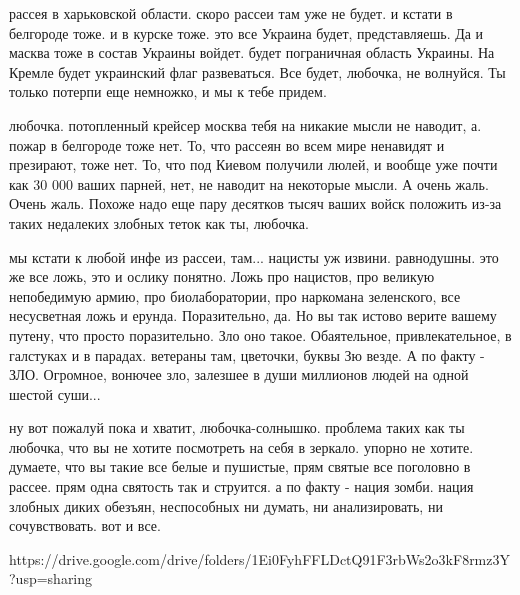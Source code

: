 рассея в харьковской области. скоро рассеи там уже не будет. и кстати в
белгороде тоже. и в курске тоже. это все Украина будет, представляешь. Да и
масква тоже в состав Украины войдет. будет пограничная область Украины. На
Кремле будет украинский флаг развеваться. Все будет, любочка, не волнуйся. Ты
только потерпи еще немножко, и мы к тебе придем.

любочка. потопленный крейсер москва тебя на никакие мысли не наводит, а. пожар
в белгороде тоже нет. То, что рассеян во всем мире ненавидят и презирают, тоже
нет. То, что под Киевом получили люлей, и вообще уже почти как 30 000 ваших
парней, нет, не наводит на некоторые мысли. А очень жаль. Очень жаль. Похоже
надо еще пару десятков тысяч ваших войск положить из-за таких недалеких злобных
теток как ты, любочка.

мы кстати к любой инфе из рассеи, там... нацисты уж извини. равнодушны. это же
все ложь, это и ослику понятно. Ложь про нацистов, про великую непобедимую
армию, про биолаборатории, про наркомана зеленского, все несусветная ложь и
ерунда. Поразительно, да. Но вы так истово верите вашему путену, что просто
поразительно. Зло оно такое. Обаятельное, привлекательное, в галстуках и в
парадах. ветераны там, цветочки, буквы Зю везде. А по факту - ЗЛО. Огромное,
вонючее зло, залезшее в души миллионов людей на одной шестой суши...

ну вот пожалуй пока и хватит, любочка-солнышко. проблема таких как ты любочка,
что вы не хотите посмотреть на себя в зеркало. упорно не хотите. думаете, что
вы такие все белые и пушистые, прям святые все поголовно в рассее. прям одна
святость так и струится. а по факту - нация зомби. нация злобных диких обезъян,
неспособных ни думать, ни анализировать, ни сочувствовать. вот и все.

https://drive.google.com/drive/folders/1Ei0FyhFFLDctQ91F3rbWs2o3kF8rmz3Y?usp=sharing
